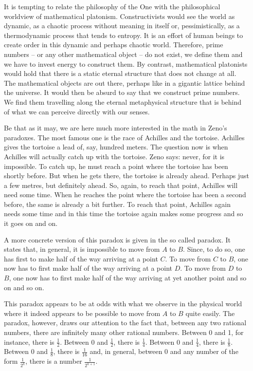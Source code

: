 \documentclass[tikz]{scrreprt}
\begin{document}
It is tempting to relate the philosophy of the One with the
philosophical worldview of mathematical platonism.
Constructivists would see the world as dynamic,
as a chaotic process without meaning in itself or,
pessimistically, as a thermodynamic process that tends to entropy.
It is an effort of human beings to create order in this
dynamic and perhaps chaotic world.
Therefore, prime numbers -- or any other mathematical object --
do not exist, we define them and we have to
invest energy to construct them.
By contrast, mathematical platonists would hold that there
is a static eternal structure that does not change at all.
The mathematical objects are out there, perhaps like in
a gigantic lattice behind the universe.
It would then be absurd to say that we construct prime numbers.
We find them travelling along the eternal metaphysical structure
that is behind of what we can perceive directly with our senses.

Be that as it may,
we are here much more interested in the math
in Zeno's paradoxes.
The most famous one is the race
of Achilles and the tortoise.
Achilles gives the tortoise a lead of, say, hundred meters.
The question now is when Achilles will actually catch up with
the tortoise. Zeno says: never, for it is impossible.
To catch up, he must reach a point where the tortoise has been
shortly before. But when he gets there, the tortoise is already
ahead. Perhaps just a few metres, but definitely ahead.
So, again, to reach that point, Achilles will need some time.
When he reaches the point where the tortoise has been a second before,
the same is already a bit further. 
To reach that point, Achilles again needs some time
and in this time the tortoise again makes some progress
and so it goes on and on. 

A more concrete version of this paradox is given in
the so called  paradox.
It states that, in general, it is impossible 
to move from $A$ to $B$.
Since, to do so, one has first to make half of the way
arriving at a point $C$. To move from $C$ to $B$,
one now has to first make half of the way
arriving at a point $D$. To move from $D$ to $B$,
one now has to first make half of the way
arriving at yet another point and so on and so on.

This paradox appears to be at odds with 
what we observe in the physical world where it
indeed appears to be possible to move from
$A$ to $B$ quite easily.
The paradox, however, draws our attention to
the fact that, between any two rational numbers,
there are infinitely many other rational numbers.
Between 0 and 1, for instance, there is $\frac{1}{2}$.
Between 0 and $\frac{1}{2}$, there is $\frac{1}{4}$.
Between 0 and $\frac{1}{4}$, there is $\frac{1}{8}$.
Between 0 and $\frac{1}{8}$, there is $\frac{1}{16}$
and, in general, between 0 and any number of the form
$\frac{1}{2^k}$, there is a number $\frac{1}{2^{k+1}}$.
\end{document}
